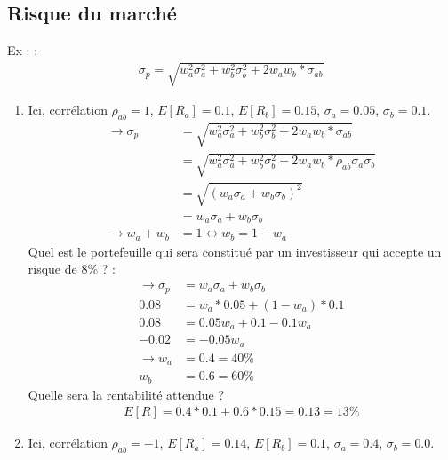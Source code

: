 \newpage
\subsection{Risque du marché}

Ex :  :
\begin{align*}
    \sigma_p = \sqrt{w_a^2 \sigma_a^2 + w_b^2 \sigma_b^2 + 2 w_a w_b * \sigma_{ab}}
\end{align*}

\begin{enumerate}
    \item Ici, corrélation $\rho_{ab} = 1$, $E[R_a] = 0.1$, $E[R_b] = 0.15$, $\sigma_a = 0.05$, $\sigma_b = 0.1$.
    \begin{align*}
        \longrightarrow \sigma_p &= \sqrt{w_a^2 \sigma_a^2 + w_b^2 \sigma_b^2 + 2 w_a w_b * \sigma_{ab}} \\
                                 &= \sqrt{w_a^2 \sigma_a^2 + w_b^2 \sigma_b^2 + 2 w_a w_b * \rho_{ab} \sigma_a \sigma_b} \\
                                 &= \sqrt{(w_a \sigma_a + w_b \sigma_b)^2} \\
                                 &= w_a \sigma_a + w_b \sigma_b \\
        \longrightarrow w_a + w_b &= 1 \leftrightarrow w_b = 1 - w_a
    \end{align*}
    Quel est le portefeuille qui sera constitué par un investisseur qui accepte un risque de 8\% ? :
    \begin{align*}
        \longrightarrow \sigma_p &= w_a \sigma_a + w_b \sigma_b  \\
                            0.08 &= w_a * 0.05 + (1 - w_a) * 0.1 \\
                            0.08 &= 0.05 w_a + 0.1  - 0.1 w_a \\
                           -0.02 &= -0.05 w_a \\
        \longrightarrow      w_a &= 0.4 = 40\% \\
                             w_b &= 0.6 = 60\%
    \end{align*}
    Quelle sera la rentabilité attendue ?
    \begin{align*}
        E[R] = 0.4 * 0.1 + 0.6 * 0.15 = 0.13 = 13\%
    \end{align*}
    \item Ici, corrélation $\rho_{ab} = -1$, $E[R_a] = 0.14$, $E[R_b] = 0.1$, $\sigma_a = 0.4$, $\sigma_b = 0.0$.
    \begin{align*}

\end{align*}
\end{enumerate}
